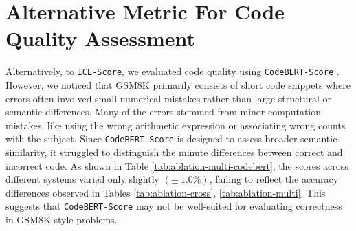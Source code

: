 \section{Alternative Metric For Code Quality Assessment}
Alternatively, to \texttt{ICE-Score}, we evaluated code quality using \texttt{CodeBERT-Score} \cite{codebertscore}. 
%
However, we noticed that GSM8K \cite{cobbe2021gsm8k} primarily consists of short code snippets where errors often involved small numerical mistakes rather than large structural or semantic differences.
%
Many of the errors stemmed from minor computation mistakes, like using the wrong arithmetic expression or associating wrong counts with the subject.
%
Since \texttt{CodeBERT-Score} is designed to assess broader semantic similarity, it struggled to distinguish the minute differences between correct and incorrect code.
%
As shown in Table \ref{tab:ablation-multi-codebert}, the scores across different systems varied only slightly $(\pm ~1.0\%)$, failing to reflect the accuracy differences observed in Tables \ref{tab:ablation-cross}, \ref{tab:ablation-multi}.
%
This suggests that \texttt{CodeBERT-Score} may not be well-suited for evaluating correctness in GSM8K-style problems.

